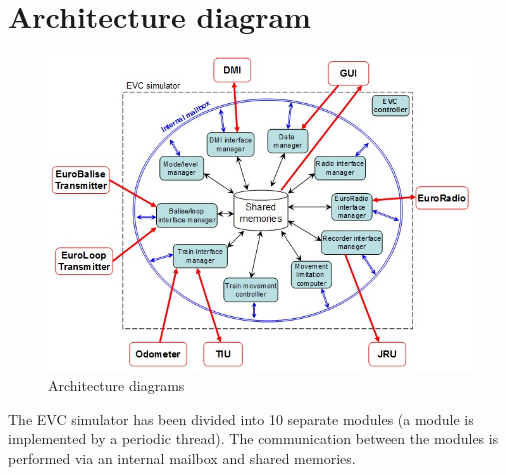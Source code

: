 \documentclass[nocc]{template/openetcs_report}
\begin{document}
\section{Architecture diagram}
\begin{figure}[!h]
  \centering
  \includegraphics[width=\textwidth]{image/evc_archi_diagram}
  \caption{Architecture diagrams}
  \label{fig:Architecture diagram}
\end{figure}
The EVC simulator has been divided into 10 separate modules (a module is implemented by a periodic thread). The communication between the modules is performed via an internal mailbox and shared memories.
\end{document}
